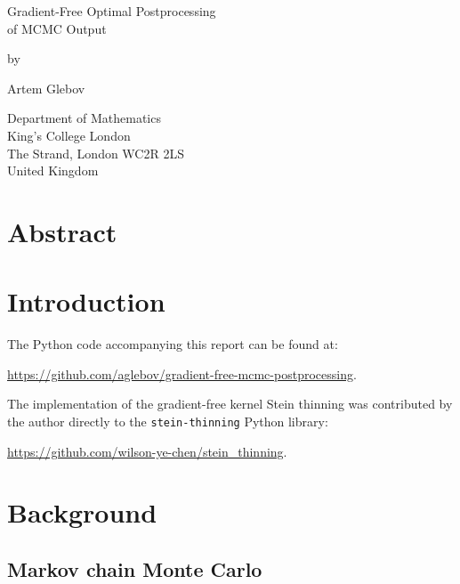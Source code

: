 \documentclass[11pt,a4paper]{report}
\date{}
\begin{document}

\thispagestyle{empty}
\begin{center}
{\huge
Gradient-Free Optimal Postprocessing \\
of MCMC Output

\bigskip
\bigskip

by
\bigskip
\bigskip

Artem Glebov
}
\end{center}
\vfill

\begin{center}
{\large
Department of Mathematics\\
King's College London\\
The Strand, London WC2R 2LS\\
United Kingdom\\
\medskip

}
\end{center}
\bigskip


\newpage
\setcounter{page}{1}
\restoregeometry

\chapter*{Abstract}


\tableofcontents


\chapter*{Introduction}

The Python code accompanying this report can be found at:
\begin{center}
\url{https://github.com/aglebov/gradient-free-mcmc-postprocessing}.
\end{center}

The implementation of the gradient-free kernel Stein thinning was contributed by the author directly to the \texttt{stein-thinning} Python library:
\begin{center}
\url{https://github.com/wilson-ye-chen/stein_thinning}.
\end{center}

\chapter{Background}

\section{Markov chain Monte Carlo}
\end{document}
